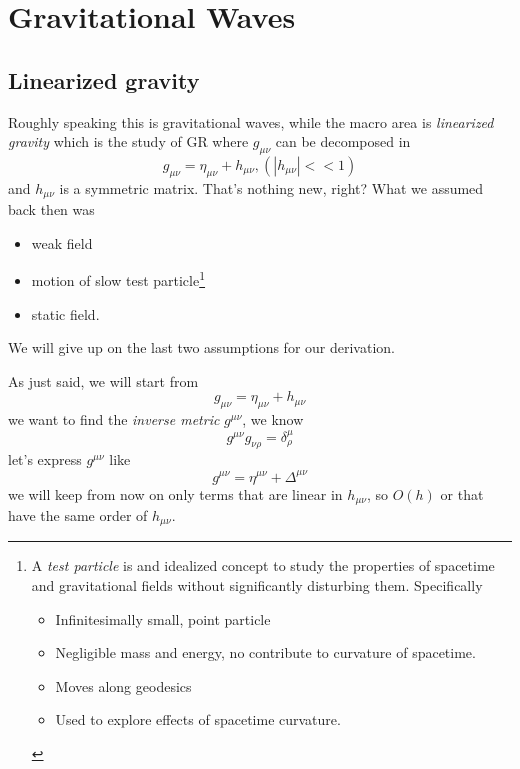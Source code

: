 \chapter{Gravitational Waves}
\section{Linearized gravity}
Roughly speaking this is gravitational waves, while the macro area is \emph{linearized gravity} which is the study of GR where $g_{\mu \nu }$ can be decomposed in
\[
g_{\mu \nu } = \eta _{\mu \nu }+ h_{\mu \nu }, \left( |h_{\mu \nu }|<<1 \right)
\]
and $h_{\mu \nu }$ is a symmetric matrix.
That's nothing new, right? What we assumed back then was
\begin{itemize}
\item weak field
\item motion of slow test particle\footnote{A \emph{test particle} is and idealized concept to study the properties of spacetime and gravitational fields without significantly disturbing them. Specifically
	\begin{itemize}
	\item Infinitesimally small, point particle
	\item Negligible mass and energy, no contribute to curvature of spacetime.
	\item Moves along geodesics
	\item Used to explore effects of spacetime curvature.
	\end{itemize}
	}
\item static field.
\end{itemize}
We will give up on the last two assumptions for our derivation.\par
As just said, we  will start from
\begin{equation}
g_{\mu \nu } = \eta _{\mu \nu } + h_{\mu \nu } 
\end{equation}
we want to find the \emph{inverse metric} $g^{\mu \nu }$, we know
\[
g^{\mu \nu }g_{\nu \rho  } = \delta ^{\mu }_{\rho }
\]
let's express $g^{\mu \nu }$ like
\begin{equation}\label{eq:inversemetric}
g^{\mu \nu } = \eta ^{\mu \nu } + \Delta ^{\mu \nu }
\end{equation}
we will keep from now on only terms that are linear in $h_{\mu \nu }$, so $O\left( h \right)$ or that have the same order of $h_{\mu \nu }$.\par
